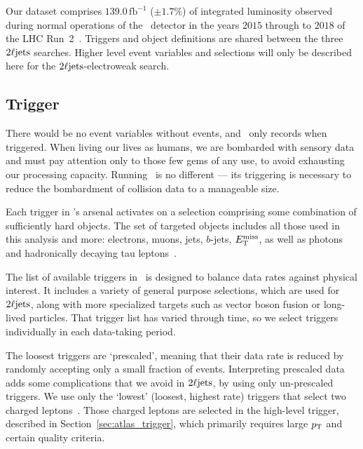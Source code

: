 Our dataset comprises $139.0\,\mathrm{fb}^{-1}$ ($\pm 1.7\%$) of integrated
luminosity observed during normal operations of the \atlas\ detector in the
years $2015$ through to $2018$ of the LHC Run~2~\cite{DAPR-2018-01}.
Triggers and object definitions are shared between the three $2\ell\mathrm{jets}$
searches.
Higher level event variables and selections will only be described here for the
$2\ell\mathrm{jets}$-electroweak search.


\subsection{Trigger}
\label{sec:2ljets_trigger}
There would be no event variables without events, and \atlas\ only records
when triggered.
When living our lives as humans, we are bombarded with sensory data and must
pay attention only to those few gems of any use, to avoid exhausting our
processing capacity.
Running \atlas\ is no different --- its triggering is necessary to reduce the
bombardment of collision data to a manageable size.

Each trigger in \atlas's arsenal activates on a selection comprising some
combination of sufficiently hard objects.
The set of targeted objects includes all those used in this analysis and more:
electrons, muons, jets, $b$-jets, $E_\mathrm{T}^\mathrm{miss}$, as well as photons and hadronically
decaying tau leptons~\cite{atlas2008experiment}.

The list of available triggers in \atlas\ is designed to balance data rates
against physical interest.
It includes a variety of general purpose selections, which are used for
$2\ell\mathrm{jets}$, along with more specialized targets such as vector boson fusion
or long-lived particles.
That trigger list has varied through time, so we select triggers individually
in each data-taking period.

The loosest triggers are `prescaled', meaning that their data rate is reduced
by randomly accepting only a small fraction of events.
Interpreting prescaled data adds some complications that we avoid in
$2\ell\mathrm{jets}$, by using only un-prescaled triggers.
We use only the `lowest' (loosest, highest rate) triggers that select two
charged leptons~\cite{atlas_twiki_lowest_unprescaled}.
Those charged leptons are selected in the high-level trigger,
described in Section~\ref{sec:atlas_trigger}, which
primarily requires large $p_\mathrm{T}$ and certain quality criteria.


